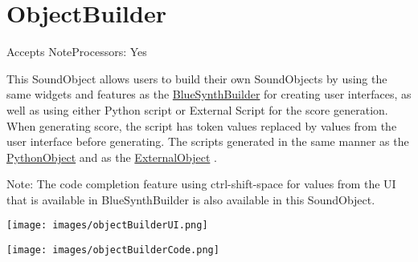 \section{ObjectBuilder}\label{objectBuilder}

Accepts NoteProcessors: Yes

This SoundObject allows users to build their own SoundObjects by using
the same widgets and features as the
\protect\hyperlink{blueSynthBuilder}{BlueSynthBuilder} for creating user
interfaces, as well as using either Python script or External Script for
the score generation. When generating score, the script has token values
replaced by values from the user interface before generating. The
scripts generated in the same manner as the
\protect\hyperlink{pythonObject}{PythonObject} and as the
\protect\hyperlink{externalSoundObject}{ExternalObject} .

Note: The code completion feature using ctrl-shift-space for values from
the UI that is available in BlueSynthBuilder is also available in this
SoundObject.

\texttt{[image: images/objectBuilderUI.png]}

\texttt{[image: images/objectBuilderCode.png]}
